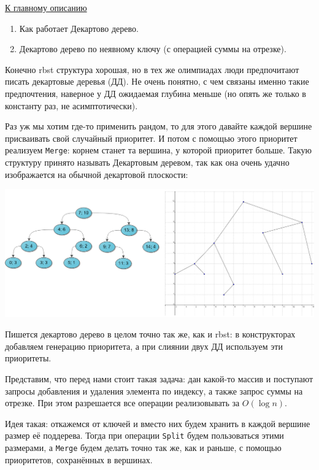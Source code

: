 \label{md2tex9}
\hyperref[md2texREADME]{К главному описанию}


\begin{enumerate}
    \item Как работает Декартово дерево.
    \item Декартово дерево по неявному ключу (с операцией суммы на отрезке).
\end{enumerate}


Конечно rbst структура хорошая, но в тех же олимпиадах люди предпочитают писать декартовые деревья (ДД). Не очень понятно, с чем связаны именно такие предпочтения, наверное у ДД ожидаемая глубина меньше (но опять же только в константу раз, не асимптотически).


Раз уж мы хотим где-то применить рандом, то для этого давайте каждой вершине присваивать свой случайный приоритет. И потом с помощью этого приоритет реализуем \texttt{Merge}: корнем станет та вершина, у которой приоритет больше. Такую структуру принято называть Декартовым деревом, так как она очень удачно изображается на обычной декартовой плоскости:

\includegraphics[scale=0.4]{9-treap.png}

Пишется декартово дерево в целом точно так же, как и rbst: в конструкторах добавляем генерацию приоритета, а при слиянии двух ДД используем эти приоритеты.


Представим, что перед нами стоит такая задача: дан какой-то массив и поступают запросы добавления и удаления элемента по индексу, а также запрос суммы на отрезке. При этом разрешается все операции реализовывать за $O(\log n)$.

Идея такая: откажемся от ключей и вместо них будем хранить в каждой вершине размер её поддерева. Тогда при операции \texttt{Split} будем пользоваться этими размерами, а \texttt{Merge} будем делать точно так же, как и раньше, с помощью приоритетов, сохранённых в вершинах.

